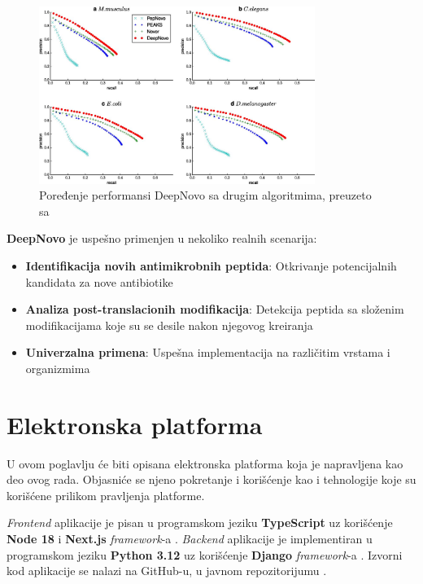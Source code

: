 \documentclass[12pt,oneside]{memoir}
\begin{document}
\begin{figure}[h]
\centering
\includegraphics[width=0.8\textwidth]{images/deep_novo_comparison.jpeg}
\caption{Poređenje performansi DeepNovo sa drugim algoritmima, preuzeto sa \cite{deepnovo}}
\label{fig:performanse}
\end{figure}

\textbf{DeepNovo} je uspešno primenjen u nekoliko realnih scenarija:

\begin{itemize}
\item \textbf{Identifikacija novih antimikrobnih peptida}: Otkrivanje potencijalnih kandidata za nove antibiotike
\item \textbf{Analiza post-translacionih modifikacija}: Detekcija peptida sa složenim modifikacijama koje su se desile nakon njegovog kreiranja
\item \textbf{Univerzalna primena}: Uspešna implementacija na različitim vrstama i organizmima
\end{itemize}


\chapter{Elektronska platforma}

U ovom poglavlju će biti opisana elektronska platforma koja je napravljena kao deo ovog rada. Objasniće se njeno pokretanje i korišćenje kao i tehnologije koje su korišćene prilikom pravljenja platforme.

\emph{Frontend} aplikacije je pisan u programskom jeziku \textbf{TypeScript} \cite{typescript} uz korišćenje \textbf{Node 18} \cite{node} i \textbf{Next.js} \emph{framework}-a \cite{next}.
\emph{Backend} aplikacije je implementiran u programskom jeziku \textbf{Python 3.12} \cite{python} uz korišćenje \textbf{Django} \emph{framework}-a \cite{django}. Izvorni kod aplikacije se nalazi na GitHub-u, u javnom repozitorijumu \cite{github}.
\end{document}
